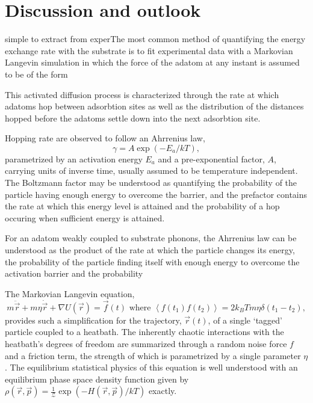 \documentclass[7pt]{article}
\begin{document}
\section*{Discussion and outlook}

simple to extract from experThe most common method of quantifying the energy exchange rate with the substrate is to fit experimental data with a Markovian Langevin simulation in which the force of the adatom at any instant is assumed to be of the form 



This activated diffusion process is characterized through the rate at which adatoms hop between adsorbtion sites as well as the distribution of the distances hopped before the adatoms settle down into the next adsorbtion site. 

Hopping rate are observed to follow an Ahrrenius law\cite{someone}, $$\gamma=A\exp(-E_a/kT),$$ parametrized by an activation energy $E_a$ and a pre-exponential factor, $A$, carrying units of inverse time, usually assumed to be temperature independent. The Boltzmann factor may be understood as quantifying the probability of the particle having enough energy to overcome the barrier, and the prefactor contains the rate at which this energy level is attained and the probability of a hop occuring when sufficient energy is attained.



For an adatom weakly coupled to substrate phonons, the Ahrrenius law can be understood as the product of the rate at which the particle changes its energy, the probability of the particle finding itself with enough energy to overcome the activation barrier and the probability  

The Markovian Langevin equation, 
\begin{equation}
	m\ddot{\vec{r}}+m\eta\dot{\vec{r}}+\nabla U(\vec{r})=\vec{f}(t) \text{ where } \left<f(t_1)f(t_2)\right>=2k_BTm\eta\delta(t_1-t_2),
	\label{eq:langevin}
\end{equation}
provides such a simplification for the trajectory, $\vec{r}(t)$, of a single `tagged' particle coupled to a heatbath\cite{Kramers}. The inherently chaotic interactions with the heatbath's degrees of freedom are summarized through a random noise force $f$ and a friction term, the strength of which is parametrized by a single parameter $\eta$. The equilibrium statistical physics of this equation is well understood with an equilibrium phase space density function given by $\rho(\vec{r}, \vec{p})=\frac{1}{\mathcal{Z}}\exp\left(-H(\vec{r}, \vec{p})/kT\right)$ exactly\cite{Zwanzig}.
\end{document}
